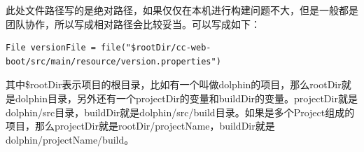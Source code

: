 \documentclass[letter]{book}
\begin{document}
此处文件路径写的是绝对路径，如果仅仅在本机进行构建问题不大，但是一般都是团队协作，所以写成相对路径会比较妥当。可以写成如下：

\begin{lstlisting}
File versionFile = file("$rootDir/cc-web-boot/src/main/resource/version.properties")
\end{lstlisting}

其中\$rootDir表示项目的根目录，比如有一个叫做dolphin的项目，那么rootDir就是dolphin目录，另外还有一个projectDir的变量和buildDir的变量。projectDir就是dolphin/src目录，buildDir就是dolphin/src/build目录。如果是多个Project组成的项目，那么projectDir就是rootDir/projectName，buildDir就是dolphin/projectName/build。
\end{document}

